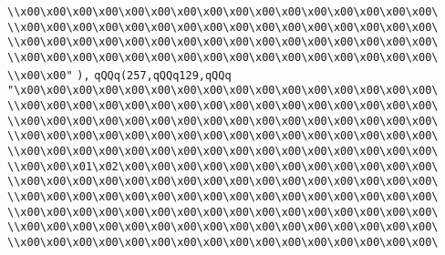 \verb|\\x00\x00\x00\x00\x00\x00\x00\x00\x00\x00\x00\x00\x00\x00\x00\x00\|\newline
\verb|\\x00\x00\x00\x00\x00\x00\x00\x00\x00\x00\x00\x00\x00\x00\x00\x00\|\newline
\verb|\\x00\x00\x00\x00\x00\x00\x00\x00\x00\x00\x00\x00\x00\x00\x00\x00\|\newline
\verb|\\x00\x00\x00\x00\x00\x00\x00\x00\x00\x00\x00\x00\x00\x00\x00\x00\|\newline
\verb|\\x00\x00"|\newline
\verb|),|\newline
\verb|qQQq(257,qQQq129,qQQq|\newline
\verb|"\x00\x00\x00\x00\x00\x00\x00\x00\x00\x00\x00\x00\x00\x00\x00\x00\|\newline
\verb|\\x00\x00\x00\x00\x00\x00\x00\x00\x00\x00\x00\x00\x00\x00\x00\x00\|\newline
\verb|\\x00\x00\x00\x00\x00\x00\x00\x00\x00\x00\x00\x00\x00\x00\x00\x00\|\newline
\verb|\\x00\x00\x00\x00\x00\x00\x00\x00\x00\x00\x00\x00\x00\x00\x00\x00\|\newline
\verb|\\x00\x00\x00\x00\x00\x00\x00\x00\x00\x00\x00\x00\x00\x00\x00\x00\|\newline
\verb|\\x00\x00\x01\x02\x00\x00\x00\x00\x00\x00\x00\x00\x00\x00\x00\x00\|\newline
\verb|\\x00\x00\x00\x00\x00\x00\x00\x00\x00\x00\x00\x00\x00\x00\x00\x00\|\newline
\verb|\\x00\x00\x00\x00\x00\x00\x00\x00\x00\x00\x00\x00\x00\x00\x00\x00\|\newline
\verb|\\x00\x00\x00\x00\x00\x00\x00\x00\x00\x00\x00\x00\x00\x00\x00\x00\|\newline
\verb|\\x00\x00\x00\x00\x00\x00\x00\x00\x00\x00\x00\x00\x00\x00\x00\x00\|\newline
\verb|\\x00\x00\x00\x00\x00\x00\x00\x00\x00\x00\x00\x00\x00\x00\x00\x00\|\newline
